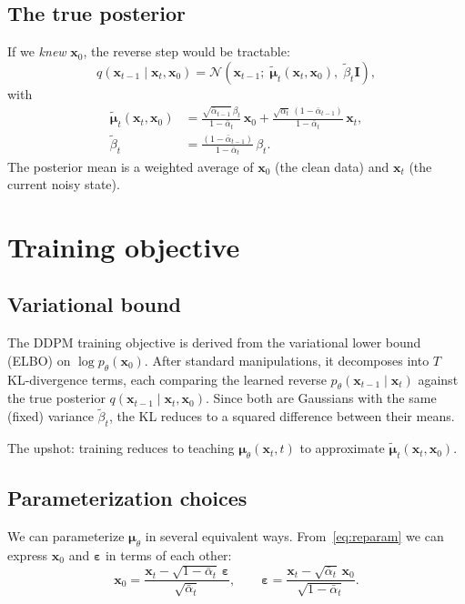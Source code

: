 \documentclass[11pt]{article}
\newcommand{\xb}{\bm{x}}
\newcommand{\eps}{\bm{\varepsilon}}
\newcommand{\abar}{\bar{\alpha}}
\newcommand{\N}{\mathcal{N}}
\begin{document}
\subsection{The true posterior}

If we \emph{knew} $\xb_0$, the reverse step would be tractable:
\begin{equation}\label{eq:posterior}
    q(\xb_{t-1} \mid \xb_t, \xb_0)
    = \N\!\left(\xb_{t-1};\; \tilde{\bm{\mu}}_t(\xb_t, \xb_0),\;
      \tilde{\beta}_t \bm{I}\right),
\end{equation}
with
\begin{align}
    \tilde{\bm{\mu}}_t(\xb_t, \xb_0)
    &= \frac{\sqrt{\abar_{t-1}}\,\beta_t}{1 - \abar_t}\,\xb_0
     + \frac{\sqrt{\alpha_t}\,(1 - \abar_{t-1})}{1 - \abar_t}\,\xb_t,
    \label{eq:posterior_mean} \\[6pt]
    \tilde{\beta}_t
    &= \frac{(1 - \abar_{t-1})}{1 - \abar_t}\,\beta_t.
    \label{eq:posterior_var}
\end{align}
The posterior mean is a weighted average of $\xb_0$ (the clean data) and
$\xb_t$ (the current noisy state).

\section{Training objective}

\subsection{Variational bound}

The DDPM training objective is derived from the variational lower bound
(ELBO) on $\log p_\theta(\xb_0)$.  After standard manipulations, it
decomposes into $T$ KL-divergence terms, each comparing the learned reverse
$p_\theta(\xb_{t-1} \mid \xb_t)$ against the true posterior
$q(\xb_{t-1} \mid \xb_t, \xb_0)$.  Since both are Gaussians with the
same (fixed) variance $\tilde\beta_t$, the KL reduces to a squared
difference between their means.

The upshot: training reduces to teaching $\bm\mu_\theta(\xb_t, t)$ to
approximate $\tilde{\bm\mu}_t(\xb_t, \xb_0)$.

\subsection{Parameterization choices}

We can parameterize $\bm\mu_\theta$ in several equivalent ways.  From~\eqref{eq:reparam} we can express $\xb_0$ and $\eps$ in terms of each
other:
\begin{equation}
    \xb_0 = \frac{\xb_t - \sqrt{1-\abar_t}\,\eps}{\sqrt{\abar_t}},
    \qquad
    \eps = \frac{\xb_t - \sqrt{\abar_t}\,\xb_0}{\sqrt{1-\abar_t}}.
\end{equation}
\end{document}
